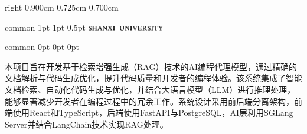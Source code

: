 \documentclass[
    report,     %
    oneside,    %
    UTF8,       %
    zihao=-4    %
]{config} %
\begin{document}
\CoverPage
    {right} %
    {0.900cm} %
    {0.725cm} %
    {0.700cm} %


\Header
    {common} %
    {1pt} %
    {1pt} %
    {0.5pt} %
    {} %
    {\includegraphics[width=0.25\textwidth]{figures/logos/SXU-title-EN.png}} %
    {} %


\Footer
    {common} %
    {0pt} %
    {0pt} %
    {0pt} %
    {} %
    {\thepage} %
    {} %


\SetRomanPageNumber{} %


\begin{abstractCN}[0.6cm] %

本项目旨在开发基于检索增强生成（RAG）技术的AI编程代理模型，通过精确的文档解析与代码生成优化，提升代码质量和开发者的编程体验。该系统集成了智能文档检索、自动化代码生成与优化，并结合大语言模型（LLM）进行推理处理，能够显著减少开发者在编程过程中的冗余工作。系统设计采用前后端分离架构，前端使用React和TypeScript，后端使用FastAPI与PostgreSQL，AI层利用SGLang Server并结合LangChain技术实现RAG处理。


\def\keywordsCN{AI编程代理；RAG；代码生成；文档解析；LangChain；SGLang}

\end{abstractCN}

\end{document}
